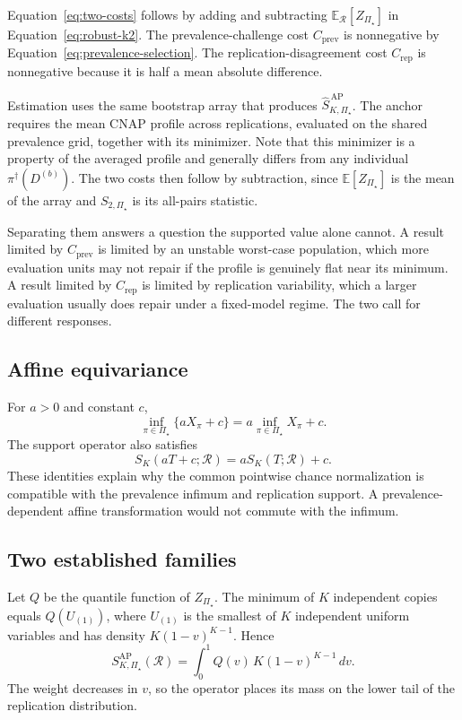 \documentclass[11pt]{article}
\newcommand{\Regime}{\mathcal{R}}
\newcommand{\PSet}{\Pi_\star}
\newcommand{\E}{\mathbb{E}}
\newcommand{\SRobHat}{\widehat S_{K,\PSet}^{\,\mathrm{AP}}}
\theoremstyle{remark}
\begin{document}
Equation~\eqref{eq:two-costs} follows by adding and subtracting $\E_{\Regime}[Z_{\PSet}]$ in Equation~\eqref{eq:robust-k2}. The prevalence-challenge cost $C_{\mathrm{prev}}$ is nonnegative by Equation~\eqref{eq:prevalence-selection}. The replication-disagreement cost $C_{\mathrm{rep}}$ is nonnegative because it is half a mean absolute difference.

Estimation uses the same bootstrap array that produces $\SRobHat$. The anchor requires the mean CNAP profile across replications, evaluated on the shared prevalence grid, together with its minimizer. Note that this minimizer is a property of the averaged profile and generally differs from any individual $\pi^\dagger(D^{(b)})$. The two costs then follow by subtraction, since $\E[Z_{\PSet}]$ is the mean of the array and $S_{2,\PSet}$ is its all-pairs statistic.

Separating them answers a question the supported value alone cannot. A result limited by $C_{\mathrm{prev}}$ is limited by an unstable worst-case population, which more evaluation units may not repair if the profile is genuinely flat near its minimum. A result limited by $C_{\mathrm{rep}}$ is limited by replication variability, which a larger evaluation usually does repair under a fixed-model regime. The two call for different responses.

\subsection{Affine equivariance}

For $a>0$ and constant $c$,
\[
\inf_{\pi\in\PSet}\{aX_\pi+c\}
=
a\inf_{\pi\in\PSet}X_\pi+c.
\]
The support operator also satisfies
\[
S_K(aT+c;\Regime)
=
aS_K(T;\Regime)+c.
\]
These identities explain why the common pointwise chance normalization is compatible with the prevalence infimum and replication support. A prevalence-dependent affine transformation would not commute with the infimum.

\subsection{Two established families}
\label{app:families}

Let $Q$ be the quantile function of $Z_{\PSet}$. The minimum of $K$ independent copies equals $Q(U_{(1)})$, where $U_{(1)}$ is the smallest of $K$ independent uniform variables and has density $K(1-v)^{K-1}$. Hence
\begin{equation}
S_{K,\PSet}^{\mathrm{AP}}(\Regime)
=
\int_0^1
Q(v)\,K(1-v)^{K-1}\,dv.
\label{eq:quantile-weight}
\end{equation}
The weight decreases in $v$, so the operator places its mass on the lower tail of the replication distribution.
\end{document}
